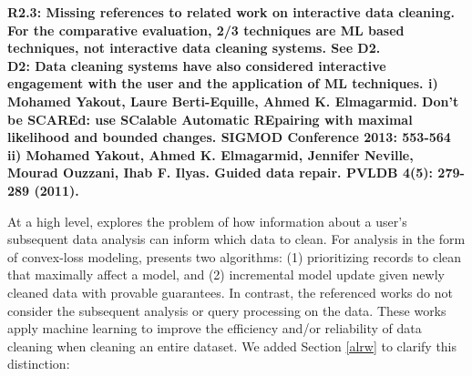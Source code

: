 \vspace{0.5em}

\noindent\textbf{R2.3: Missing references to related work on interactive data cleaning. For the comparative evaluation, 2/3 techniques are ML based techniques, not interactive data cleaning systems. See D2.\\
D2: Data cleaning systems have also considered interactive engagement with the user and the application of ML techniques. 
i) Mohamed Yakout, Laure Berti-Equille, Ahmed K. Elmagarmid. Don't be SCAREd: use SCalable Automatic REpairing with maximal likelihood and bounded changes. SIGMOD Conference 2013: 553-564
ii) Mohamed Yakout, Ahmed K. Elmagarmid, Jennifer Neville, Mourad Ouzzani, Ihab F. Ilyas.
Guided data repair. PVLDB 4(5): 279-289 (2011).
}

At a high level, \sys explores the problem of how information about a user's subsequent data analysis can inform which data to clean.
For analysis in the form of convex-loss modeling, \sys presents two algorithms: (1) prioritizing records to clean that maximally affect a model, and (2) incremental model update given newly cleaned data with provable guarantees. 
In contrast, the referenced works do not consider the subsequent analysis or query processing on the data.
These works apply machine learning to improve the efficiency and/or reliability of data cleaning when cleaning an entire dataset.
We added Section \ref{alrw} to clarify this distinction:

